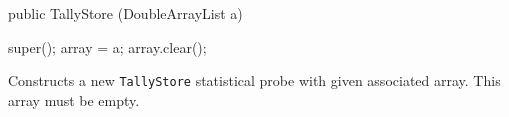 \begin{htmlonly}
\end{htmlonly}
\begin{code}

   public TallyStore (DoubleArrayList a) \begin{hide} {
      super();
      array = a;
      array.clear();
   }\end{hide}
\end{code}
\begin{tabb}  Constructs a new \texttt{TallyStore} statistical probe
    with given associated array.  This array must be empty.
\end{tabb}
\begin{htmlonly}
\end{htmlonly}

